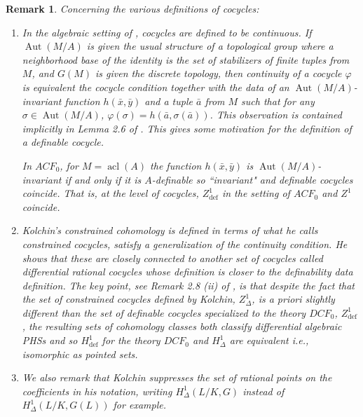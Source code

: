 \documentclass{article}
\theoremstyle{problemstyle}
\newtheorem{remark}[problem]{Remark}
\DeclareMathOperator{\defin}{def} %
\DeclareMathOperator{\aut}{Aut} %
\DeclareMathOperator{\acl}{acl} %
\begin{document}
\begin{remark}
    Concerning the various definitions of cocycles:

    \begin{enumerate}
        \item In the algebraic setting of \cite{serre1979galois}, cocycles are defined to be continuous. If $\aut(M/A)$ is given the usual structure of a topological group where a neighborhood base of the identity is the set of stabilizers of finite tuples from $M$, and $G(M)$ is given the discrete topology, then continuity of a cocycle $\varphi$ is equivalent the cocycle condition together with the data of an $\aut(M/A)$-invariant function $h(\bar{x},\bar{y})$ and a tuple $\bar{a}$ from $M$ such that for any $\sigma \in \aut(M/A)$, $\varphi(\sigma) = h(\bar{a},\sigma(\bar{a}))$. This observation is contained implicitly in Lemma 2.6 of \cite{pillay_1997}. This gives some motivation for the definition of a definable cocycle.
        
        In $ACF_0$, for $M = \acl(A)$ the function $h(\bar{x},\bar{y})$ is $\aut(M/A)$-invariant if and only if it is $A$-definable so ``invariant" and definable cocycles coincide. That is, at the level of cocycles, $Z^{1}_{\defin}$ in the setting of $ACF_0$ and $Z^1$ coincide.

        \item Kolchin's constrained cohomology is defined in terms of what he calls constrained cocycles, satisfy a generalization of the continuity condition. He shows that these are closely connected to another set of cocycles called differential rational cocycles whose definition is closer to the definability data definition. The key point, see Remark 2.8 (ii) of \cite{pillay_1997}, is that despite the fact that the set of constrained cocycles defined by Kolchin, $Z^1_{\Delta}$, is a priori slightly different than the set of definable cocycles specialized to the theory $DCF_0$, $Z^1_{\defin}$, the resulting sets of cohomology classes both classify differential algebraic PHSs and so $H^1_{\defin}$ for the theory $DCF_0$ and $H^1_{\Delta}$ are equivalent i.e., isomorphic as pointed sets. 
        
        \item We also remark that Kolchin suppresses the set of rational points on the coefficients in his notation, writing $H^1_\Delta(L/K,G)$ instead of $H^1_\Delta(L/K,G(L))$ for example.
    \end{enumerate}
    
\end{remark}
\end{document}
